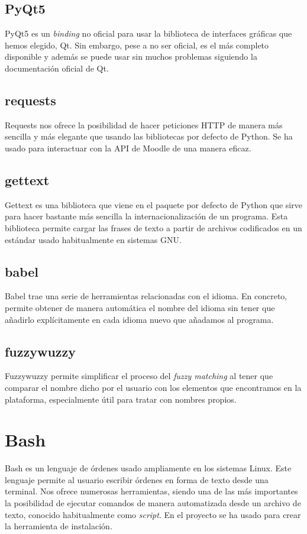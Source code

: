 \subsection{PyQt5}
PyQt5 \cite{pyqt5} es un \textit{binding} no oficial para usar la biblioteca de interfaces gráficas que hemos elegido, Qt. Sin embargo, pese a no ser oficial, es el más completo disponible y además se puede usar sin muchos problemas siguiendo la documentación oficial de Qt.
\subsection{requests}
Requests \cite{requests} nos ofrece la posibilidad de hacer peticiones HTTP de manera más sencilla y más elegante que usando las bibliotecas por defecto de Python. Se ha usado para interactuar con la API de Moodle de una manera eficaz.
\subsection{gettext}
Gettext \cite{gettext} es una biblioteca que viene en el paquete por defecto de Python que sirve para hacer bastante más sencilla la internacionalización de un programa. Esta biblioteca permite cargar las frases de texto a partir de archivos codificados en un estándar usado habitualmente en sistemas GNU.
\subsection{babel}
Babel \cite{babel} trae una serie de herramientas relacionadas con el idioma. En concreto, permite obtener de manera automática el nombre del idioma sin tener que añadirlo explícitamente en cada idioma nuevo que añadamos al programa.
\subsection{fuzzywuzzy}
Fuzzywuzzy \cite{fuzzywuzzy} permite simplificar el proceso del \textit{fuzzy matching} al tener que comparar el nombre dicho por el usuario con los elementos que encontramos en la plataforma, especialmente útil para tratar con nombres propios.

\section{Bash}
Bash \cite{bash} es un lenguaje de órdenes usado ampliamente en los sistemas Linux. Este lenguaje permite al usuario escribir órdenes en forma de texto desde una terminal. Nos ofrece numerosas herramientas, siendo una de las más importantes la posibilidad de ejecutar comandos de manera automatizada desde un archivo de texto, conocido habitualmente como \textit{script}. En el proyecto se ha usado para crear la herramienta de instalación.

